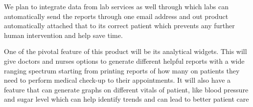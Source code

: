 We plan to integrate data from lab services as well through which labs can automatically send the reports through one email address and out product automatically attached that to its correct patient which prevents any further human intervention and help save time.

One of the pivotal feature of this product will be its analytical widgets. This will give doctors and nurses options to generate different helpful reports with a wide ranging spectrum starting from printing reports of how many on patients they need to perform medical check-up to their appointments. It will also have a feature that can generate graphs on different vitals of patient, like blood pressure and sugar level which can help identify trends and can lead to better patient care

